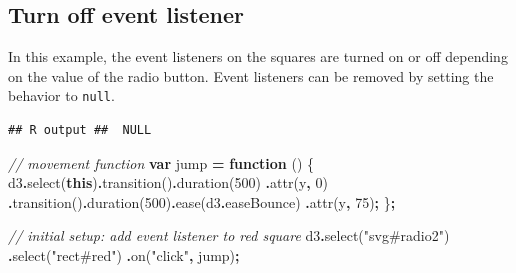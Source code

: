\documentclass[
  openany]{book}
\newenvironment{Shaded}{\begin{snugshade}}{\end{snugshade}}
\newcommand{\AttributeTok}[1]{\textcolor[rgb]{0.77,0.63,0.00}{#1}}
\newcommand{\CommentTok}[1]{\textcolor[rgb]{0.56,0.35,0.01}{\textit{#1}}}
\newcommand{\DecValTok}[1]{\textcolor[rgb]{0.00,0.00,0.81}{#1}}
\newcommand{\FunctionTok}[1]{\textcolor[rgb]{0.00,0.00,0.00}{#1}}
\newcommand{\KeywordTok}[1]{\textcolor[rgb]{0.13,0.29,0.53}{\textbf{#1}}}
\newcommand{\NormalTok}[1]{#1}
\newcommand{\OperatorTok}[1]{\textcolor[rgb]{0.81,0.36,0.00}{\textbf{#1}}}
\newcommand{\StringTok}[1]{\textcolor[rgb]{0.31,0.60,0.02}{#1}}
\begin{document}
\hypertarget{turn-off-event-listener}{%
\subsection{Turn off event listener}\label{turn-off-event-listener}}

In this example, the event listeners on the squares are turned on or off depending on the value of the radio button. Event listeners can be removed by setting the behavior to \texttt{null}.

\begin{verbatim}
## R output ##  NULL
\end{verbatim}

\begin{Shaded}
\begin{Highlighting}[]
\CommentTok{// movement function}
\KeywordTok{var}\NormalTok{ jump }\OperatorTok{=} \KeywordTok{function}\NormalTok{ () \{}
\NormalTok{      d3}\OperatorTok{.}\FunctionTok{select}\NormalTok{(}\KeywordTok{this}\NormalTok{)}\OperatorTok{.}\FunctionTok{transition}\NormalTok{()}\OperatorTok{.}\FunctionTok{duration}\NormalTok{(}\DecValTok{500}\NormalTok{)}
      \OperatorTok{.}\FunctionTok{attr}\NormalTok{(}\StringTok{\textquotesingle{}y\textquotesingle{}}\OperatorTok{,} \StringTok{\textquotesingle{}0\textquotesingle{}}\NormalTok{)}
      \OperatorTok{.}\FunctionTok{transition}\NormalTok{()}\OperatorTok{.}\FunctionTok{duration}\NormalTok{(}\DecValTok{500}\NormalTok{)}\OperatorTok{.}\FunctionTok{ease}\NormalTok{(d3}\OperatorTok{.}\AttributeTok{easeBounce}\NormalTok{)}
      \OperatorTok{.}\FunctionTok{attr}\NormalTok{(}\StringTok{\textquotesingle{}y\textquotesingle{}}\OperatorTok{,} \StringTok{\textquotesingle{}75\textquotesingle{}}\NormalTok{)}\OperatorTok{;}
\NormalTok{\}}\OperatorTok{;}

\CommentTok{// initial setup: add event listener to red square}
\NormalTok{d3}\OperatorTok{.}\FunctionTok{select}\NormalTok{(}\StringTok{"svg\#radio2"}\NormalTok{)}
  \OperatorTok{.}\FunctionTok{select}\NormalTok{(}\StringTok{"rect\#red"}\NormalTok{)}
  \OperatorTok{.}\FunctionTok{on}\NormalTok{(}\StringTok{"click"}\OperatorTok{,}\NormalTok{ jump)}\OperatorTok{;}
    

\end{Highlighting}
\end{Shaded}
\end{document}
